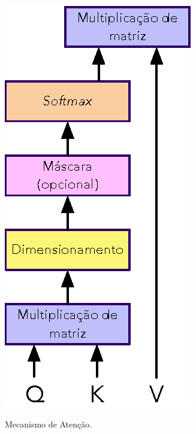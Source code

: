 \begin{frame}
	\begin{figure}[!ht]
		\centering
		\includegraphics[scale=0.65]{figs/attention.eps}	
		\label{f.attention}
		\caption{Mecanismo de Atenção.}
	\end{figure}
\end{frame}


